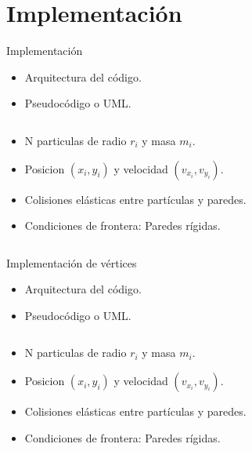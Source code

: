 \documentclass{beamer}
\begin{document}
\section{Implementación}
\begin{frame}{Implementación}
  \begin{itemize}
    \item Arquitectura del código.
    \item Pseudocódigo o UML.
  \end{itemize}
  \begin{column}{0.5\textwidth}
    \begin{itemize}
      \item N particulas de radio $r_i$ y masa $m_i$.
      \item Posicion $(x_i, y_i)$ y velocidad $(v_{x_i}, v_{y_i})$.
      \item Colisiones elásticas entre partículas y paredes.
      \item Condiciones de frontera: Paredes rígidas.
    \end{itemize}
  \end{column}
\end{frame}
\begin{frame}{Implementación de vértices}
  \begin{itemize}
    \item Arquitectura del código.
    \item Pseudocódigo o UML.
  \end{itemize}
  \begin{column}{0.5\textwidth}
    \begin{itemize}
      \item N particulas de radio $r_i$ y masa $m_i$.
      \item Posicion $(x_i, y_i)$ y velocidad $(v_{x_i}, v_{y_i})$.
      \item Colisiones elásticas entre partículas y paredes.
      \item Condiciones de frontera: Paredes rígidas.
    \end{itemize}
  \end{column}
\end{frame}

\end{document}
